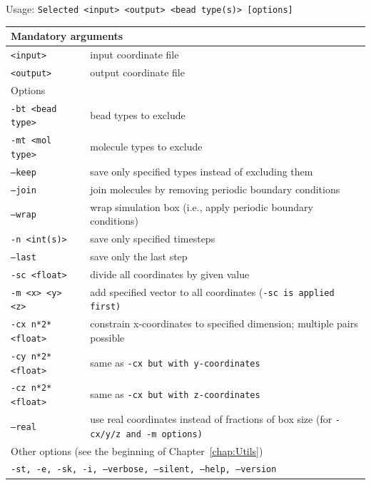 \vspace{1em}
\noindent
Usage: \tt{Selected <input> <output> <bead type(s)> [options]}
\noindent
\begin{longtable}{p{}p{}}
  \toprule
  \multicolumn{2}{l}{Mandatory arguments}\\
  \midrule
  \tt{<input>}        & input coordinate file\\
  \tt{<output>}       & output coordinate file\\
  \midrule
  \multicolumn{2}{l}{Options}\\
  \midrule
  \tt{-bt <bead type>} & bead types to exclude\\
  \tt{-mt <mol type>}  & molecule types to exclude\\
  \tt{--keep}          & save only specified types instead of excluding them\\
  \tt{--join}          & join molecules by removing periodic boundary
                         conditions\\
  \tt{--wrap}          & wrap simulation box (i.e., apply periodic boundary
                         conditions)\\
  \tt{-n <int(s)>}     & save only specified timesteps\\
  \tt{--last}          & save only the last step\\
  \tt{-sc <float>}     & divide all coordinates by given value\\
  \tt{-m <x> <y> <z>}  & add specified vector to all coordinates (\tt{-sc} is
                         applied first)\\
  \tt{-cx n*2*<float>} & constrain x-coordinates to specified dimension;
                         multiple pairs possible\\
  \tt{-cy n*2*<float>} & same as \tt{-cx} but with y-coordinates\\
  \tt{-cz n*2*<float>} & same as \tt{-cx} but with z-coordinates\\
  \tt{--real}          & use real coordinates instead of fractions of box size
                         (for \tt{-cx/y/z} and \tt{-m} options)\\
  \midrule
  \multicolumn{2}{l}{Other options (see the beginning of
                     Chapter~\ref{chap:Utils})}\\
  \midrule
  \multicolumn{2}{p{0.948\textwidth}}{\tt{-st},
                                      \tt{-e},
                                      \tt{-sk},
                                      \tt{-i},
                                      \tt{--verbose},
                                      \tt{--silent},
                                      \tt{--help},
                                      \tt{--version}}\\
  \bottomrule
\end{longtable}
